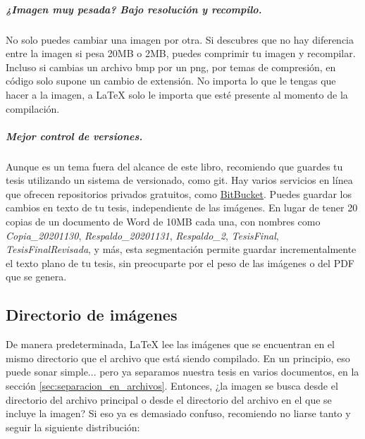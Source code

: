 \subparagraph{¿Imagen muy pesada? Bajo resolución y recompilo.} No solo puedes cambiar una imagen por otra. Si descubres que no hay diferencia entre la imagen si pesa 20MB o 2MB, puedes comprimir tu imagen y recompilar. Incluso si cambias un archivo bmp por un png, por temas de compresión, en código solo supone un cambio de extensión. No importa lo que le tengas que hacer a la imagen, a \LaTeX{} solo le importa que esté presente al momento de la compilación.

\subparagraph{Mejor control de versiones.} Aunque es un tema fuera del alcance de este libro, recomiendo que guardes tu tesis utilizando un sistema de versionado, como git. Hay varios servicios en línea que ofrecen repositorios privados gratuitos, como \href{https://bitbucket.org/}{BitBucket}. Puedes guardar los cambios en texto de tu tesis, independiente de las imágenes. En lugar de tener 20 copias de un documento de Word de 10MB cada una, con nombres como \emph{Copia\_20201130}, \emph{Respaldo\_20201131}, \emph{Respaldo\_2}, \emph{TesisFinal}, \emph{TesisFinalRevisada}, y más, esta segmentación permite guardar incrementalmente el texto plano de tu tesis, sin preocuparte por el peso de las imágenes o del PDF que se genera.



\subsection{Directorio de imágenes}
\label{sub:directorio_de_imagenes}



De manera predeterminada, \LaTeX{} lee las imágenes que se encuentran en el mismo directorio que el archivo que está siendo compilado. En un principio, eso puede sonar simple... pero ya separamos nuestra tesis en varios documentos, en la sección \ref{sec:separacion_en_archivos}. Entonces, ¿la imagen se busca desde el directorio del archivo principal o desde el directorio del archivo en el que se incluye la imagen? Si eso ya es demasiado confuso, recomiendo no liarse tanto y seguir la siguiente distribución:
\vspace{\topsep}
\vspace{\topsep}

